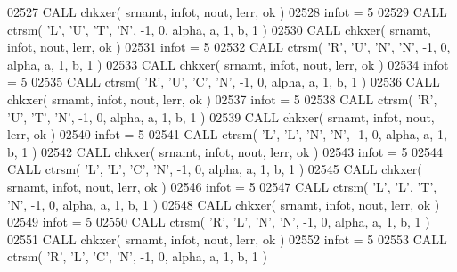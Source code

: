\begin{DoxyCode}
02527       \textcolor{keyword}{CALL }chkxer( srnamt, infot, nout, lerr, ok )
02528       infot = 5
02529       \textcolor{keyword}{CALL }ctrsm( \textcolor{stringliteral}{'L'}, \textcolor{stringliteral}{'U'}, \textcolor{stringliteral}{'T'}, \textcolor{stringliteral}{'N'}, -1, 0, alpha, a, 1, b, 1 )
02530       \textcolor{keyword}{CALL }chkxer( srnamt, infot, nout, lerr, ok )
02531       infot = 5
02532       \textcolor{keyword}{CALL }ctrsm( \textcolor{stringliteral}{'R'}, \textcolor{stringliteral}{'U'}, \textcolor{stringliteral}{'N'}, \textcolor{stringliteral}{'N'}, -1, 0, alpha, a, 1, b, 1 )
02533       \textcolor{keyword}{CALL }chkxer( srnamt, infot, nout, lerr, ok )
02534       infot = 5
02535       \textcolor{keyword}{CALL }ctrsm( \textcolor{stringliteral}{'R'}, \textcolor{stringliteral}{'U'}, \textcolor{stringliteral}{'C'}, \textcolor{stringliteral}{'N'}, -1, 0, alpha, a, 1, b, 1 )
02536       \textcolor{keyword}{CALL }chkxer( srnamt, infot, nout, lerr, ok )
02537       infot = 5
02538       \textcolor{keyword}{CALL }ctrsm( \textcolor{stringliteral}{'R'}, \textcolor{stringliteral}{'U'}, \textcolor{stringliteral}{'T'}, \textcolor{stringliteral}{'N'}, -1, 0, alpha, a, 1, b, 1 )
02539       \textcolor{keyword}{CALL }chkxer( srnamt, infot, nout, lerr, ok )
02540       infot = 5
02541       \textcolor{keyword}{CALL }ctrsm( \textcolor{stringliteral}{'L'}, \textcolor{stringliteral}{'L'}, \textcolor{stringliteral}{'N'}, \textcolor{stringliteral}{'N'}, -1, 0, alpha, a, 1, b, 1 )
02542       \textcolor{keyword}{CALL }chkxer( srnamt, infot, nout, lerr, ok )
02543       infot = 5
02544       \textcolor{keyword}{CALL }ctrsm( \textcolor{stringliteral}{'L'}, \textcolor{stringliteral}{'L'}, \textcolor{stringliteral}{'C'}, \textcolor{stringliteral}{'N'}, -1, 0, alpha, a, 1, b, 1 )
02545       \textcolor{keyword}{CALL }chkxer( srnamt, infot, nout, lerr, ok )
02546       infot = 5
02547       \textcolor{keyword}{CALL }ctrsm( \textcolor{stringliteral}{'L'}, \textcolor{stringliteral}{'L'}, \textcolor{stringliteral}{'T'}, \textcolor{stringliteral}{'N'}, -1, 0, alpha, a, 1, b, 1 )
02548       \textcolor{keyword}{CALL }chkxer( srnamt, infot, nout, lerr, ok )
02549       infot = 5
02550       \textcolor{keyword}{CALL }ctrsm( \textcolor{stringliteral}{'R'}, \textcolor{stringliteral}{'L'}, \textcolor{stringliteral}{'N'}, \textcolor{stringliteral}{'N'}, -1, 0, alpha, a, 1, b, 1 )
02551       \textcolor{keyword}{CALL }chkxer( srnamt, infot, nout, lerr, ok )
02552       infot = 5
02553       \textcolor{keyword}{CALL }ctrsm( \textcolor{stringliteral}{'R'}, \textcolor{stringliteral}{'L'}, \textcolor{stringliteral}{'C'}, \textcolor{stringliteral}{'N'}, -1, 0, alpha, a, 1, b, 1 )

\end{DoxyCode}
